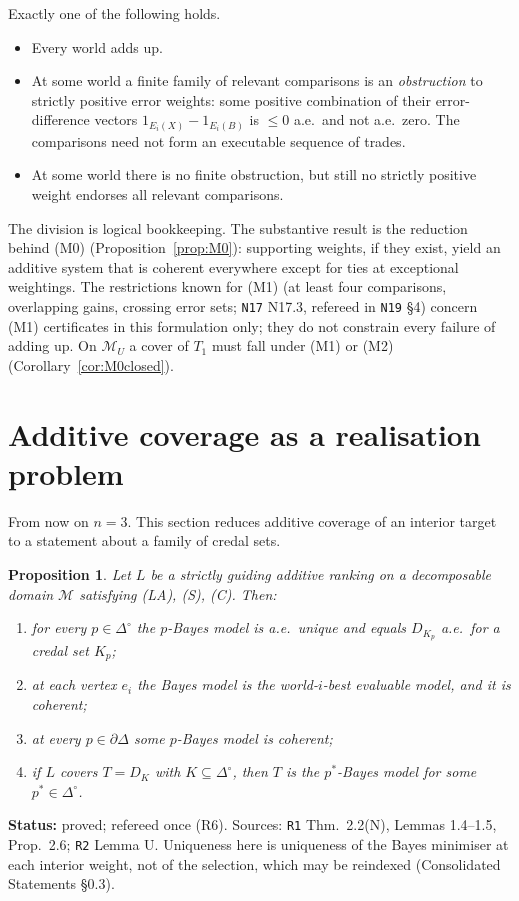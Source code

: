 \documentclass[11pt]{article}
\newtheorem{proposition}[theorem]{Proposition}
\theoremstyle{definition}
\theoremstyle{remark}
\newcommand{\Di}{\Delta^{\circ}}
\newcommand{\M}{\mathcal M}
\newcommand{\src}[1]{\texttt{#1}}
\newcommand{\status}[1]{\par\smallskip\noindent\textbf{Status:} #1\par\smallskip}
\begin{document}
Exactly one of the following holds.
\begin{itemize}[leftmargin=*]
\item[\textbf{(M0)}] Every world adds up.
\item[\textbf{(M1)}] At some world a finite family of relevant comparisons is an \emph{obstruction} to strictly positive error weights: some positive combination of their error-difference vectors $1_{E_i(X)}-1_{E_i(B)}$ is $\le0$ a.e.\ and not a.e.\ zero. The comparisons need not form an executable sequence of trades.
\item[\textbf{(M2)}] At some world there is no finite obstruction, but still no strictly positive weight endorses all relevant comparisons.
\end{itemize}
The division is logical bookkeeping. The substantive result is the reduction behind (M0) (Proposition~\ref{prop:M0}): supporting weights, if they exist, yield an additive system that is coherent everywhere except for ties at exceptional weightings. The restrictions known for (M1) (at least four comparisons, overlapping gains, crossing error sets; \src{N17} N17.3, refereed in \src{N19} \S4) concern (M1) certificates in this formulation only; they do not constrain every failure of adding up. On $\M_U$ a cover of $T_1$ must fall under (M1) or (M2) (Corollary~\ref{cor:M0closed}).

\section{Additive coverage as a realisation problem}\label{sec:reduction}

From now on $n=3$. This section reduces additive coverage of an interior target to a statement about a family of credal sets.

\begin{proposition}\label{prop:necessary}
Let $L$ be a strictly guiding additive ranking on a decomposable domain $\M$ satisfying (LA), (S), (C). Then:
\begin{enumerate}[leftmargin=*,label=(\alph*)]
\item for every $p\in\Di$ the $p$-Bayes model is a.e.\ unique and equals $D_{K_p}$ a.e.\ for a credal set $K_p$;
\item at each vertex $e_i$ the Bayes model is the world-$i$-best evaluable model, and it is coherent;
\item at every $p\in\partial\Delta$ some $p$-Bayes model is coherent;
\item if $L$ covers $T=D_K$ with $K\subseteq\Di$, then $T$ is the $p^*$-Bayes model for some $p^*\in\Di$.
\end{enumerate}
\end{proposition}
\status{proved; refereed once (R6). Sources: \src{R1} Thm.~2.2(N), Lemmas 1.4--1.5, Prop.~2.6; \src{R2} Lemma U. Uniqueness here is uniqueness of the Bayes minimiser at each interior weight, not of the selection, which may be reindexed (Consolidated Statements \S0.3).}
\end{document}
